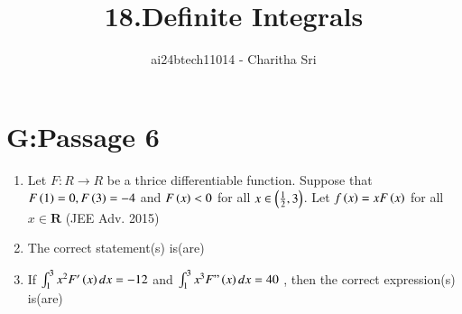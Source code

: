 \documentclass[journal,12pt,onecolumn]{IEEEtran}
\theoremstyle{remark}
\begin{document}

\vspace{3cm}

\title{18.Definite Integrals}
\author{ai24btech11014 - Charitha Sri}

\maketitle
\bigskip       
\renewcommand{\thefigure}{\theenumi}
\renewcommand{\thetable}{\theenumi}
\section{G:Passage 6}



\begin{enumerate}
 \item Let $F: R\rightarrow R$ be a thrice differentiable function. Suppose that $F\left(1\right)=0, F\left(3\right)=-4$ and $F\left(x\right)<0$ for all $x \in \left(\frac{1}{2},3\right)$. Let $f\left(x\right)=x F\left(x\right)$ for all $ x \in \mathbf{R}$                        \hfill{(JEE Adv. 2015)}
\item The correct statement(s) is(are) 
 \begin{enumerate}
 \end{enumerate}

\item If $\int_{1}^{3}x^2F^\prime\left(x\right)dx=-12$ and $\int_{1}^{3}x^3F"\left(x\right)dx=40$ , then the correct expression(s) is(are) 
 \begin{enumerate}
        \end{enumerate}
\end{enumerate}
\end{document}
